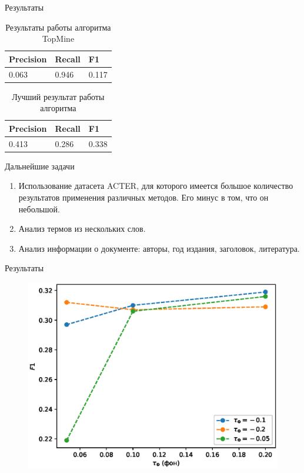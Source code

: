 \documentclass{beamer}
\begin{document}
\begin{frame}{Результаты}
\begin{table}[ht]
    \caption{Результаты работы алгоритма TopMine}
    \label{table:TopMine}
    \centering\medskip
    \begin{tabular}{|l|l|l|}
    \hline
        Precision & Recall & F1 \\ \hline
        0.063 & 0.946 & 0.117 \\
        \hline
    \end{tabular}
\end{table}

\begin{table}[ht]
    \caption{Лучший результат работы алгоритма}
    \label{table:TopMine}
    \centering\medskip
    \begin{tabular}{|l|l|l|}
    \hline
        Precision & Recall & F1 \\ \hline
        0.413 & 0.286 & 0.338 \\
        \hline
    \end{tabular}
\end{table}
\end{frame}

\begin{frame}{Дальнейшие задачи}
\begin{enumerate}
    \item Использование датасета ACTER, для которого имеется большое количество результатов применения различных методов. Его минус в том, что он небольшой.
    \item Анализ термов из нескольких слов.
    \item Анализ информации о документе: авторы, год издания, заголовок, литература.
\end{enumerate}
\end{frame}

\begin{frame}{Результаты}
\begin{figure}
   \includegraphics[width=1.0\textwidth]{Pictures/Results.eps}
\end{figure}
\end{frame}
\end{document}
